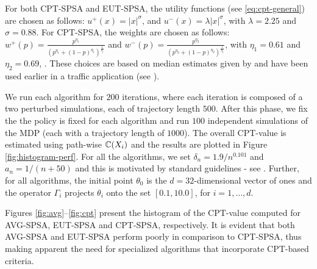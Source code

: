 For both CPT-SPSA and EUT-SPSA, the utility functions (see \eqref{eq:cpt-general}) are chosen as follows:
$u^+(x) =  |x|^{\sigma}$, and  $u^-(x) = \lambda |x|^{\sigma}$, with $\lambda = 2.25$ and $\sigma = 0.88$.
For CPT-SPSA, the weights are chosen as follows:
$w^+(p) = \frac{p^{\eta_1}}{{(p^{\eta_1}+ (1-p)^{\eta_1})}^{\frac{1}{\eta_1}}}$ and  
$w^-(p) = \frac{p^{\eta_2}}{{(p^{\eta_2}+ (1-p)^{\eta_2})}^{\frac{1}{\eta_2}}}$, with
$\eta_1 = 0.61$ and $\eta_2 = 0.69$, . These choices are based on median estimates given by \cite{tversky1992advances} and have been used earlier in a traffic application (see \cite{gao2010adaptive}).

We run each algorithm for $200$ iterations, where each iteration is composed of a two perturbed simulations, each of trajectory length $500$. After this phase, we fix the the policy is fixed for each algorithm and run $100$ independent simulations of the MDP (each with a trajectory length of $1000$). The overall CPT-value is estimated using path-wise $\mathbb{C}(X_i)$ and the results are plotted in Figure \ref{fig:histogram-perf}. For all the algorithms, we set $\delta_n = 1.9/n^{0.101}$ and $a_n = 1/(n+50)$ and this is motivated by standard guidelines - see \cite{spall2005introduction}. Further, for all algorithms, the initial point $\theta_0$ is the $d=32$-dimensional vector of ones and the operator $\Gamma_i$ projects $\theta_i$ onto the set $[0.1, 10.0]$, for $i=1,\ldots,d$.
    
Figures \ref{fig:avg}--\ref{fig:cpt} present the histogram of the CPT-value computed for AVG-SPSA, EUT-SPSA and CPT-SPSA, respectively.  It is evident that both AVG-SPSA and EUT-SPSA perform poorly in comparison to CPT-SPSA, thus making apparent the need for specialized algorithms that incorporate CPT-based criteria.


